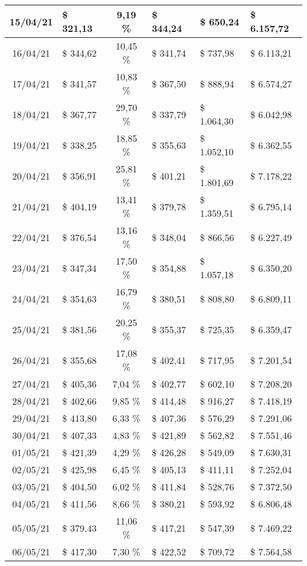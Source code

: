 \begin{center}
\begin{small}
\begin{longtable}{|c|l|c|l|l|l|}
15/04/21 & \$ 321,13 & 9,19 \% & \$ 344,24 & \$ 650,24 & \$ 6.157,72 \\ \hline
16/04/21 & \$ 344,62 & 10,45 \% & \$ 341,74 & \$ 737,98 & \$ 6.113,21 \\ \hline
17/04/21 & \$ 341,57 & 10,83 \% & \$ 367,50 & \$ 888,94 & \$ 6.574,27 \\ \hline
18/04/21 & \$ 367,77 & 29,70 \% & \$ 337,79 & \$ 1.064,30 & \$ 6.042,98 \\ \hline
19/04/21 & \$ 338,25 & 18,85 \% & \$ 355,63 & \$ 1.052,10 & \$ 6.362,55 \\ \hline
20/04/21 & \$ 356,91 & 25,81 \% & \$ 401,21 & \$ 1.801,69 & \$ 7.178,22 \\ \hline
21/04/21 & \$ 404,19 & 13,41 \% & \$ 379,78 & \$ 1.359,51 & \$ 6.795,14 \\ \hline
22/04/21 & \$ 376,54 & 13,16 \% & \$ 348,04 & \$ 866,56 & \$ 6.227,49 \\ \hline
23/04/21 & \$ 347,34 & 17,50 \% & \$ 354,88 & \$ 1.057,18 & \$ 6.350,20 \\ \hline
24/04/21 & \$ 354,63 & 16,79 \% & \$ 380,51 & \$ 808,80 & \$ 6.809,11 \\ \hline
25/04/21 & \$ 381,56 & 20,25 \% & \$ 355,37 & \$ 725,35 & \$ 6.359,47 \\ \hline
26/04/21 & \$ 355,68 & 17,08 \% & \$ 402,41 & \$ 717,95 & \$ 7.201,54 \\ \hline
27/04/21 & \$ 405,36 & 7,04 \% & \$ 402,77 & \$ 602,10 & \$ 7.208,20 \\ \hline
28/04/21 & \$ 402,66 & 9,85 \% & \$ 414,48 & \$ 916,27 & \$ 7.418,19 \\ \hline
29/04/21 & \$ 413,80 & 6,33 \% & \$ 407,36 & \$ 576,29 & \$ 7.291,06 \\ \hline
30/04/21 & \$ 407,33 & 4,83 \% & \$ 421,89 & \$ 562,82 & \$ 7.551,46 \\ \hline
01/05/21 & \$ 421,39 & 4,29 \% & \$ 426,28 & \$ 549,09 & \$ 7.630,31 \\ \hline
02/05/21 & \$ 425,98 & 6,45 \% & \$ 405,13 & \$ 411,11 & \$ 7.252,04 \\ \hline
03/05/21 & \$ 404,50 & 6,02 \% & \$ 411,84 & \$ 528,76 & \$ 7.372,50 \\ \hline
04/05/21 & \$ 411,56 & 8,66 \% & \$ 380,21 & \$ 593,92 & \$ 6.806,48 \\ \hline
05/05/21 & \$ 379,43 & 11,06 \% & \$ 417,21 & \$ 547,39 & \$ 7.469,22 \\ \hline
06/05/21 & \$ 417,30 & 7,30 \% & \$ 422,52 & \$ 709,72 & \$ 7.564,58 \\ \hline

\end{longtable}
\end{small}
\end{center}
